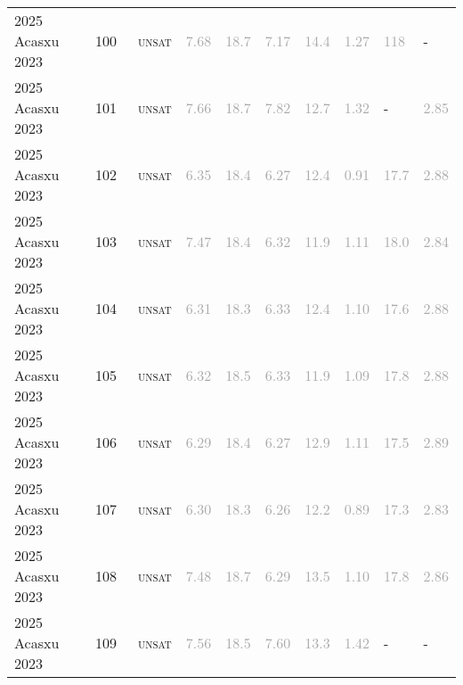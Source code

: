 \begin{center}
{\begin{longtable}{@{}llllllllll@{}}
2025 Acasxu 2023 & 100 & ~\textsc{unsat} & \textcolor{darkgray}{7.68} & \textcolor{darkgray}{18.7} & \textcolor{darkgray}{7.17} & \textcolor{darkgray}{14.4} & \textcolor{darkgray}{1.27} & \textcolor{darkgray}{118} & - \\
2025 Acasxu 2023 & 101 & ~\textsc{unsat} & \textcolor{darkgray}{7.66} & \textcolor{darkgray}{18.7} & \textcolor{darkgray}{7.82} & \textcolor{darkgray}{12.7} & \textcolor{darkgray}{1.32} & - & \textcolor{darkgray}{2.85} \\
2025 Acasxu 2023 & 102 & ~\textsc{unsat} & \textcolor{darkgray}{6.35} & \textcolor{darkgray}{18.4} & \textcolor{darkgray}{6.27} & \textcolor{darkgray}{12.4} & \textcolor{darkgray}{0.91} & \textcolor{darkgray}{17.7} & \textcolor{darkgray}{2.88} \\
2025 Acasxu 2023 & 103 & ~\textsc{unsat} & \textcolor{darkgray}{7.47} & \textcolor{darkgray}{18.4} & \textcolor{darkgray}{6.32} & \textcolor{darkgray}{11.9} & \textcolor{darkgray}{1.11} & \textcolor{darkgray}{18.0} & \textcolor{darkgray}{2.84} \\
2025 Acasxu 2023 & 104 & ~\textsc{unsat} & \textcolor{darkgray}{6.31} & \textcolor{darkgray}{18.3} & \textcolor{darkgray}{6.33} & \textcolor{darkgray}{12.4} & \textcolor{darkgray}{1.10} & \textcolor{darkgray}{17.6} & \textcolor{darkgray}{2.88} \\
2025 Acasxu 2023 & 105 & ~\textsc{unsat} & \textcolor{darkgray}{6.32} & \textcolor{darkgray}{18.5} & \textcolor{darkgray}{6.33} & \textcolor{darkgray}{11.9} & \textcolor{darkgray}{1.09} & \textcolor{darkgray}{17.8} & \textcolor{darkgray}{2.88} \\
2025 Acasxu 2023 & 106 & ~\textsc{unsat} & \textcolor{darkgray}{6.29} & \textcolor{darkgray}{18.4} & \textcolor{darkgray}{6.27} & \textcolor{darkgray}{12.9} & \textcolor{darkgray}{1.11} & \textcolor{darkgray}{17.5} & \textcolor{darkgray}{2.89} \\
2025 Acasxu 2023 & 107 & ~\textsc{unsat} & \textcolor{darkgray}{6.30} & \textcolor{darkgray}{18.3} & \textcolor{darkgray}{6.26} & \textcolor{darkgray}{12.2} & \textcolor{darkgray}{0.89} & \textcolor{darkgray}{17.3} & \textcolor{darkgray}{2.83} \\
2025 Acasxu 2023 & 108 & ~\textsc{unsat} & \textcolor{darkgray}{7.48} & \textcolor{darkgray}{18.7} & \textcolor{darkgray}{6.29} & \textcolor{darkgray}{13.5} & \textcolor{darkgray}{1.10} & \textcolor{darkgray}{17.8} & \textcolor{darkgray}{2.86} \\
2025 Acasxu 2023 & 109 & ~\textsc{unsat} & \textcolor{darkgray}{7.56} & \textcolor{darkgray}{18.5} & \textcolor{darkgray}{7.60} & \textcolor{darkgray}{13.3} & \textcolor{darkgray}{1.42} & - & - \\

\end{longtable}}
\end{center}
